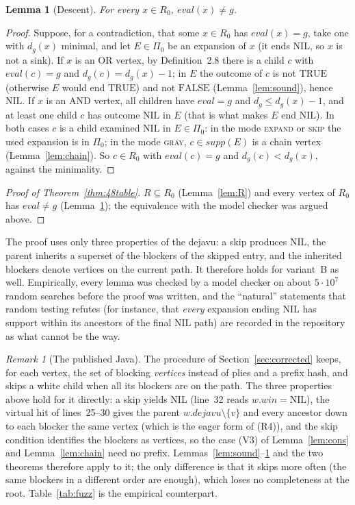\documentclass{article}
\theoremstyle{plain}
\newtheorem{lemma}[theorem]{Lemma}
\theoremstyle{definition}
\theoremstyle{remark}
\newtheorem{remark}[theorem]{Remark}
\newcommand{\eval}{\mathit{eval}}
\newcommand{\win}{\mathit{win}}
\newcommand{\dejv}{\mathit{dejavu}}
\newcommand{\TRUE}{\ensuremath{\mathrm{TRUE}}}
\newcommand{\FALSE}{\ensuremath{\mathrm{FALSE}}}
\newcommand{\NIL}{\ensuremath{\mathrm{NIL}}}
\begin{document}
\begin{lemma}[Descent]\label{lem:descent}
For every $x \in R_0$, $\eval(x) \neq g$.
\end{lemma}
\begin{proof}
Suppose, for a contradiction, that some $x \in R_0$ has $\eval(x) = g$, take one with $d_g(x)$ minimal, and let $E \in \Pi_0$ be an expansion of $x$ (it ends \NIL{}, so $x$ is not a sink). If $x$ is an OR vertex, by Definition~2.8 there is a child $c$ with $\eval(c) = g$ and $d_g(c) = d_g(x) - 1$; in $E$ the outcome of $c$ is not \TRUE{} (otherwise $E$ would end \TRUE{}) and not \FALSE{} (Lemma~\ref{lem:sound}), hence \NIL{}. If $x$ is an AND vertex, all children have $\eval = g$ and $d_g \leq d_g(x) - 1$, and at least one child $c$ has outcome \NIL{} in $E$ (that is what makes $E$ end \NIL{}). In both cases $c$ is a child examined \NIL{} in $E \in \Pi_0$: in the mode \textsc{expand} or \textsc{skip} the used expansion is in $\Pi_0$; in the mode \textsc{gray}, $c \in \mathit{supp}(E)$ is a chain vertex (Lemma~\ref{lem:chain}). So $c \in R_0$ with $\eval(c) = g$ and $d_g(c) < d_g(x)$, against the minimality.
\end{proof}

\begin{proof}[Proof of Theorem~\ref{thm:48table}]
$R \subseteq R_0$ (Lemma~\ref{lem:R}) and every vertex of $R_0$ has $\eval \neq g$ (Lemma~\ref{lem:descent}); the equivalence with the model checker was argued above.
\end{proof}

The proof uses only three properties of the dejavu: a skip produces \NIL{}, the parent inherits a superset of the blockers of the skipped entry, and the inherited blockers denote vertices on the current path. It therefore holds for variant~B as well. Empirically, every lemma was checked by a model checker on about $5 \cdot 10^7$ random searches before the proof was written, and the ``natural'' statements that random testing refutes (for instance, that \emph{every} expansion ending \NIL{} has support within its ancestors of the final \NIL{} path) are recorded in the repository as what cannot be the way.

\begin{remark}[The published Java]\label{rem:java}
The procedure of Section~\ref{sec:corrected} keeps, for each vertex, the set of blocking \emph{vertices} instead of plies and a prefix hash, and skips a white child when all its blockers are on the path. The three properties above hold for it directly: a skip yields \NIL{} (line~32 reads $w.\win = \NIL$), the virtual hit of lines~25--30 gives the parent $w.\dejv \setminus \{v\}$ and every ancestor down to each blocker the same vertex (which is the eager form of (R4)), and the skip condition identifies the blockers as vertices, so the case (V3) of Lemma~\ref{lem:cons} and Lemma~\ref{lem:chain} need no prefix. Lemmas~\ref{lem:sound}--\ref{lem:descent} and the two theorems therefore apply to it; the only difference is that it skips more often (the same blockers in a different order are enough), which loses no completeness at the root. Table~\ref{tab:fuzz} is the empirical counterpart.
\end{remark}
\end{document}
